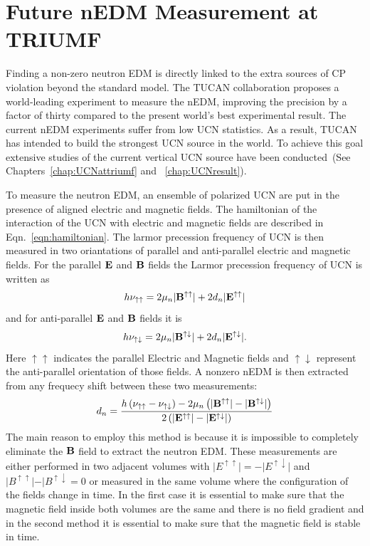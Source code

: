 \chapter{Future nEDM Measurement at TRIUMF}

Finding a non-zero neutron EDM is directly linked to the extra sources
of CP violation beyond the standard model. The TUCAN collaboration
proposes a world-leading experiment to measure the nEDM, improving the
precision by a factor of thirty compared to the present world’s best
experimental result. The current nEDM experiments suffer from low UCN
statistics. As a result, TUCAN has intended to build the strongest UCN
source in the world. To achieve this goal extensive studies of the
current vertical UCN source have been conducted~(See
Chapters~\ref{chap:UCNattriumf} and ~\ref{chap:UCNresult}).

To measure the neutron EDM, an ensemble of polarized UCN are put in
the presence of aligned electric and magnetic fields. The hamiltonian
of the interaction of the UCN with electric and magnetic fields are
described in Eqn.~\ref{eqn:hamiltonian}.  The larmor precession
frequency of UCN is then measured in two oriantations of parallel and
anti-parallel electric and magnetic fields. For the parallel $\bf{E}$
and $\bf{B}$ fields the Larmor precession frequency of UCN is written
as
\begin{equation}
\label{eqn:parallelEandB}
  h \nu_{\uparrow \uparrow} = 2 \mu_n \vert {\bf{B^{\uparrow \uparrow}}} \vert+ 2 d_n\vert \bf{ E^{\uparrow \uparrow}} \vert
\end{equation}
and for anti-parallel  $\bf{E}$ and $\bf{B}$ fields it is
\begin{equation}
\label{eqn:antiparallelEandB}
  h \nu_{\uparrow \downarrow} = 2 \mu_n \vert {\bf{B^{\uparrow \downarrow}}} \vert+ 2 d_n\vert \bf{ E^{\uparrow \downarrow}} \vert.
\end{equation}
Here $\uparrow \uparrow$ indicates the parallel Electric and Magnetic
fields and $\uparrow \downarrow$ represent the anti-parallel
orientation of those fields.
A nonzero nEDM is then extracted from any frequecy shift between these
two measurements:
\begin{equation}
  \label{eqn:dn}
  d_n = \frac{h \left( \nu_{\uparrow \uparrow} - \nu_{\uparrow \downarrow} \right) - 2 \mu_n \left( \vert {\bf{B^{\uparrow \uparrow}}} \vert -\vert {\bf{B^{\uparrow \downarrow}}} \vert \right)}{2 \left(\vert \bf{ E^{\uparrow \uparrow}} \vert - \vert \bf{ E^{\uparrow \downarrow}} \vert \right)}
\end{equation}
The main reason to employ this method is because it is impossible to
completely eliminate the $\bf{B}$ field to extract the neutron
EDM. These measurements are either performed in two adjacent volumes
with
$\vert E^{\uparrow \uparrow} \vert = - \vert E^{\uparrow \downarrow}
\vert$ and
$\vert B^{\uparrow \uparrow}\vert - \vert B^{\uparrow \downarrow} = 0
$ or measured in the same volume where the configuration of the fields
change in time. In the first case it is essential to make sure that
the magnetic field inside both volumes are the same and there is no
field gradient and in the second method it is essential to make sure
that the magnetic field is stable in time.

